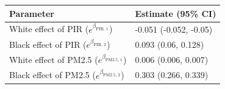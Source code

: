 \begin{table}[ht]
\centering
\begin{tabular}{ll}
  \hline
Parameter & Estimate (95\% CI) \\ 
  \hline
White effect of PIR ($e^{\beta_{\text{PIR, 1}}}$) & -0.051 (-0.052, -0.05) \\ 
  Black effect of PIR ($e^{\beta_{\text{PIR, 2}}}$) & 0.093 (0.06, 0.128) \\ 
  White effect of PM2.5 ($e^{\beta_{\text{PM2.5, 1}}}$) & 0.006 (0.006, 0.007) \\ 
  Black effect of PM2.5 ($e^{\beta_{\text{PM2.5, 2}}}$) & 0.303 (0.266, 0.339) \\ 
   \hline
\end{tabular}
\end{table}
